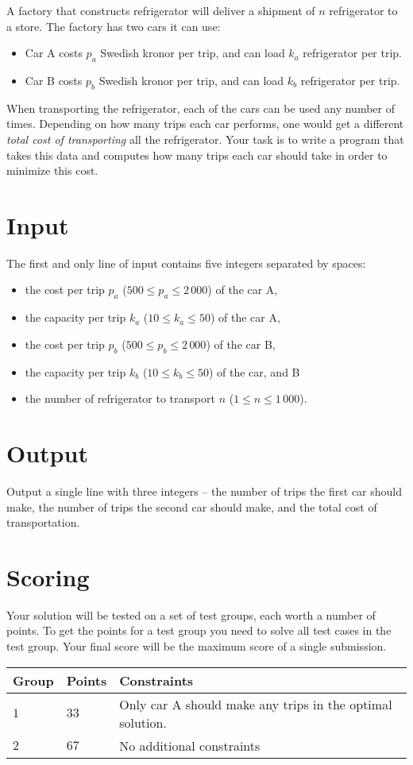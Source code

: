 A factory that constructs refrigerator will deliver a shipment of $n$ refrigerator to a store.
The factory has two cars it can use:
\begin{itemize}
    \item Car A costs $p_a$ Swedish kronor per trip, and can load $k_a$ refrigerator per trip.
    \item Car B costs $p_b$ Swedish kronor per trip, and can load $k_b$ refrigerator per trip.
\end{itemize}

When transporting the refrigerator, each of the cars can be used any number of times.
Depending on how many trips each car performs, one would get a different \emph{total cost of transporting} all the refrigerator.
Your task is to write a program that takes this data and computes how many trips each car should take in order to minimize this cost.

\section*{Input}
The first and only line of input contains five integers separated by spaces:

\begin{itemize}
    \item the cost per trip $p_a$ ($500 \le p_a \le 2\,000$) of the car A,
    \item the capacity per trip $k_a$ ($10 \le k_a \le 50$) of the car A,
    \item the cost per trip $p_b$ ($500 \le p_b \le 2\,000$) of the car B,
    \item the capacity per trip $k_b$ ($10 \le k_b \le 50$) of the car, and B
    \item the number of refrigerator to transport $n$ ($1 \le n \le 1\,000$).
\end{itemize}

\section*{Output}
Output a single line with three integers -- the number of trips the first car should make, the number of trips the second car should make, and the total cost of transportation.

\section*{Scoring}
Your solution will be tested on a set of test groups, each worth a number of points.
To get the points for a test group you need to solve all test cases in the test group. Your final score will be the maximum score of a single submission.

\noindent
\begin{tabular}{| l | l | l |}
  \hline
  Group & Points & Constraints \\ \hline
  $1$    & $33$        &  Only car A should make any trips in the optimal solution. \\ \hline
  $2$    & $67$        &  No additional constraints \\ \hline
\end{tabular}
